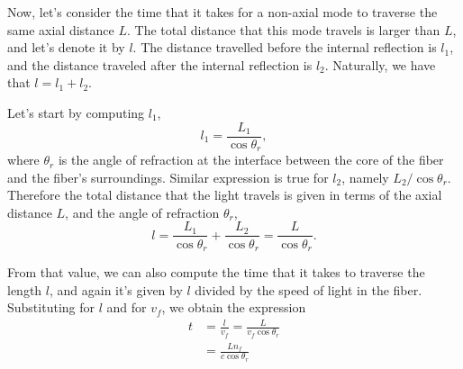 Now, let's consider the time that it takes for a non-axial mode to traverse the same axial distance $L$. The total distance that this mode travels is larger than $L$, and let's denote it by $l$.
The distance travelled before the internal reflection is $l_1$, and the distance traveled after the internal reflection is $l_2$. Naturally, we have that $l = l_1 + l_2$.

Let's start by computing $l_1$,
\begin{equation}
    l_1=\frac{L_1}{\cos \theta_r},
\end{equation}
where $\theta_r$ is the angle of refraction at the interface between the core of the fiber and the fiber's surroundings.
Similar expression is true for $l_2$, namely $L_2 / \cos \theta_r$.
Therefore the total distance that the light travels is given in terms of the axial distance $L$, and the angle of refraction $\theta_r$,
\begin{equation}
    l=\frac{L_1}{\cos \theta_r}+\frac{L_2}{\cos \theta_r}=\frac{L}{\cos \theta_r}.
\end{equation}


From that value, we can also compute the time that it takes to traverse the length $l$, and again it's given by $l$ divided by the speed of light in the fiber. Substituting for $l$ and for $v_f$, we obtain the expression
\begin{equation}
\begin{aligned}
t &=\frac{l}{v_f}=\frac{L}{v_f \cos \theta_r} \\
&=\frac{L n_f}{c \cos \theta_r}
\end{aligned}
\end{equation}




